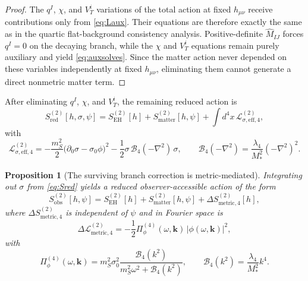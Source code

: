 \documentclass[11pt]{article}
\newtheorem{proposition}{Proposition}
\begin{document}
\begin{proof}
The \(q^I\), \(\chi\), and \(V_T^i\) variations of the total action at fixed \(h_{\mu\nu}\) receive contributions only from \eqref{eq:Laux}. Their equations are therefore exactly the same as in the quartic flat-background consistency analysis. Positive-definite \(\widehat M_{IJ}\) forces \(q^I=0\) on the decaying branch, while the \(\chi\) and \(V_T^i\) equations remain purely auxiliary and yield \eqref{eq:auxsolves}. Since the matter action never depended on these variables independently at fixed \(h_{\mu\nu}\), eliminating them cannot generate a direct nonmetric matter term.
\end{proof}

After eliminating \(q^I\), \(\chi\), and \(V_T^i\), the remaining reduced action is
\begin{equation}
S_{\mathrm{red}}^{(2)}[h,\sigma,\psi]
=
S_{\mathrm{EH}}^{(2)}[h]
+
S_{\mathrm{matter}}^{(2)}[h,\psi]
+
\int d^4x\,
\mathcal L_{\sigma,\mathrm{eff},4}^{(2)},
\label{eq:Sred}
\end{equation}
with
\begin{equation}
\mathcal L_{\sigma,\mathrm{eff},4}^{(2)}
=
-\frac{m_S^2}{2}\bigl(\partial_0\sigma-\sigma_0\phi\bigr)^2
-\frac{1}{2}\sigma\,\mathcal B_4(-\nabla^2)\,\sigma,
\qquad
\mathcal B_4(-\nabla^2)=\frac{\lambda_4}{M_*^2}(-\nabla^2)^2.
\label{eq:Lsigma}
\end{equation}

\begin{proposition}[The surviving branch correction is metric-mediated]
Integrating out \(\sigma\) from \eqref{eq:Sred} yields a reduced observer-accessible action of the form
\begin{equation}
S_{\mathrm{obs}}^{(2)}[h,\psi]
=
S_{\mathrm{EH}}^{(2)}[h]
+
S_{\mathrm{matter}}^{(2)}[h,\psi]
+
\Delta S_{\mathrm{metric},4}^{(2)}[h],
\label{eq:Sobs}
\end{equation}
where \(\Delta S_{\mathrm{metric},4}^{(2)}\) is independent of \(\psi\) and in Fourier space is
\begin{equation}
\Delta\mathcal L_{\mathrm{metric},4}^{(2)}
=
-\frac{1}{2}\Pi_\phi^{(4)}(\omega,\mathbf{k})\,|\phi(\omega,\mathbf{k})|^2,
\label{eq:Deltametric}
\end{equation}
with
\begin{equation}
\Pi_\phi^{(4)}(\omega,\mathbf{k})
=
m_S^2\sigma_0^2
\frac{\mathcal B_4(k^2)}
{m_S^2\omega^2+\mathcal B_4(k^2)},
\qquad
\mathcal B_4(k^2)=\frac{\lambda_4}{M_*^2}k^4.
\label{eq:Piphi}
\end{equation}
\end{proposition}
\end{document}
